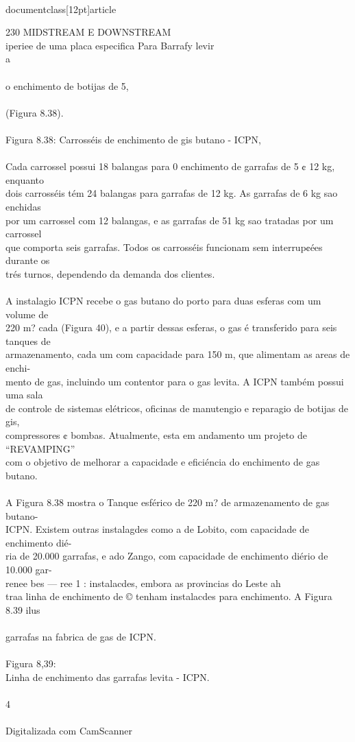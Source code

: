 \\documentclass[12pt]{article}
\begin{document}
230 MIDSTREAM E DOWNSTREAM\\
iperiee de uma placa especifica Para Barrafy levir\\
a\\
\\
o enchimento de botijas de 5,\\
\\
(Figura 8.38).\\
\\
Figura 8.38: Carrosséis de enchimento de gis butano - ICPN,\\
\\
Cada carrossel possui 18 balangas para 0 enchimento de garrafas de 5 ¢ 12 kg, enquanto\\
dois carrosséis tém 24 balangas para garrafas de 12 kg. As garrafas de 6 kg sao enchidas\\
por um carrossel com 12 balangas, e as garrafas de 51 kg sao tratadas por um carrossel\\
que comporta seis garrafas. Todos os carrosséis funcionam sem interrup¢ées durante os\\
trés turnos, dependendo da demanda dos clientes.\\
\\
A instalagio ICPN recebe o gas butano do porto para duas esferas com um volume de\\
220 m? cada (Figura 40), e a partir dessas esferas, o gas é transferido para seis tanques de\\
armazenamento, cada um com capacidade para 150 m, que alimentam as areas de enchi-\\
mento de gas, incluindo um contentor para o gas levita. A ICPN também possui uma sala\\
de controle de sistemas elétricos, oficinas de manutengio e reparagio de botijas de gis,\\
compressores ¢ bombas. Atualmente, esta em andamento um projeto de “REVAMPING”\\
com o objetivo de melhorar a capacidade e eficiéncia do enchimento de gas butano.\\
\\
A Figura 8.38 mostra o Tanque esférico de 220 m? de armazenamento de gas butano-\\
ICPN. Existem outras instalagdes como a de Lobito, com capacidade de enchimento dié-\\
ria de 20.000 garrafas, e ado Zango, com capacidade de enchimento diério de 10.000 gar-\\
renee bes — ree 1 : instalacdes, embora as provincias do Leste ah\\
traa linha de enchimento de © tenham instalacdes para enchimento. A Figura 8.39 ilus\\
\\
garrafas na fabrica de gas de ICPN.\\
\\
Figura 8,39:\\
Linha de enchimento das garrafas levita - ICPN.\\
\\
4\\
\\
Digitalizada com CamScanner\\
\end{document}
